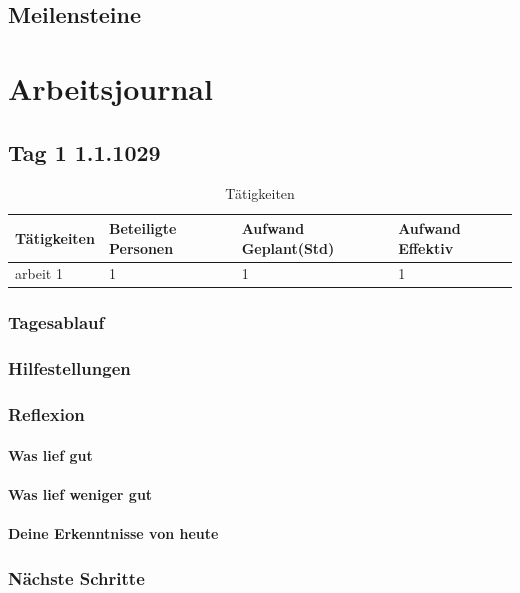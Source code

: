 \documentclass{report}
\begin{document}
\section{Meilensteine}

\chapter{Arbeitsjournal}
\section{Tag 1 1.1.1029}
\begin{table}[H]
    \begin{tabular}{|L{0.4\textwidth}|C{60pt}|C{60pt}|C{60pt}|}
        \hline
        Tätigkeiten & Beteiligte Personen & Aufwand Geplant(Std) & Aufwand Effektiv \\
        \hline
        arbeit 1 & 1 & 1 & 1 \\
        \hline
    \end{tabular}
    \caption{Tätigkeiten}
\end{table}
\subsection{Tagesablauf}
\lipsum[1-3]
\subsection{Hilfestellungen}
\subsection{Reflexion}
\subsubsection*{Was lief gut}

\subsubsection*{Was lief weniger gut}

\subsubsection*{Deine Erkenntnisse von heute}


\subsection{Nächste Schritte}
\end{document}
